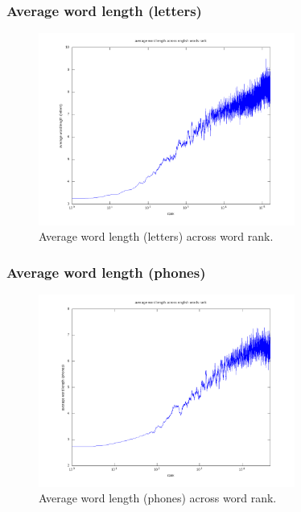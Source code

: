 \documentclass[notes]{beamer}
\begin{document}
\frame
{
  \frametitle{Average word length (letters)}
  \vspace{-0.2cm}
\begin{figure}[h!]
\centering
\includegraphics[width=0.75\textwidth]{images/averagewordslength_en.png}
\vspace{-0.2cm}
\caption{Average word length (letters) across word rank.}
\label{fig:averagewordslength_en}
\end{figure}   
}


\frame
{
  \frametitle{Average word length (phones)}
  \vspace{-0.2cm}
\begin{figure}[h!]
\centering
\includegraphics[width=0.75\textwidth]{images/averagewordsphoneslength_en.png}
\vspace{-0.2cm}
\caption{Average word length (phones) across word rank.}
\label{fig:averagewordsphoneslength_en}
\end{figure}   
}
\end{document}
